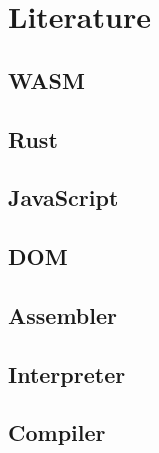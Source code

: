 \newpage
\section{Literature} \label{infos}
\subsection{WASM} \label{wasm}

\subsection{Rust} \label{rust}

\subsection{JavaScript} \label{javascript}

\subsection{DOM} \label{dom}

\subsection{Assembler} \label{assembler}

\subsection{Interpreter} \label{interpreter}

\subsection{Compiler} \label{compiler}
